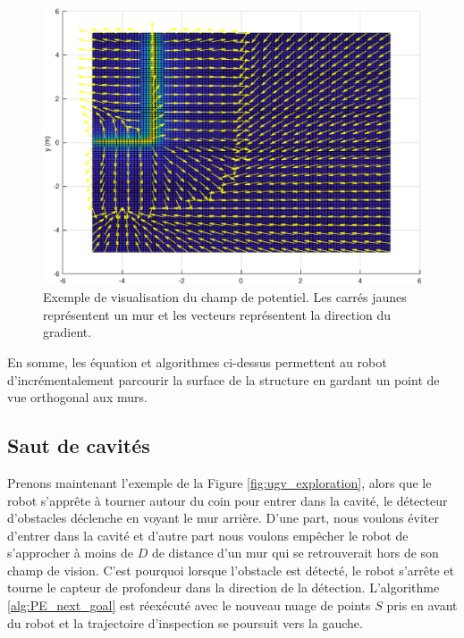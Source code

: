 \begin{figure}[ht]
  \centering
  \includegraphics[width=0.7\linewidth]{images/champ_de_potentiel.eps}
  \caption{Exemple de visualisation du champ de potentiel. Les carrés jaunes représentent un mur et les vecteurs représentent la direction du gradient. }
  \label{fig:potential_field}
\end{figure}

En somme, les équation et algorithmes ci-dessus permettent au robot d'incrémentalement parcourir la surface de la structure en gardant un point de vue orthogonal aux murs.

\subsection{Saut de cavités}
\label{subsec:ugv_cavity_skip}

Prenons maintenant l'exemple de la Figure \ref{fig:ugv_exploration}, alors que le robot s'apprête à tourner autour du coin pour entrer dans la cavité, le détecteur d'obstacles déclenche en voyant le mur arrière. D'une part, nous voulons éviter d'entrer dans la cavité et d'autre part nous voulons empêcher le robot de s'approcher à moins de $D$ de distance d'un mur qui se retrouverait hors de son champ de vision. C'est pourquoi lorsque l'obstacle est détecté, le robot s'arrête et tourne le capteur de profondeur dans la direction de la détection. L'algorithme \ref{alg:PE_next_goal} est réexécuté avec le nouveau nuage de points $S$ pris en avant du robot et la trajectoire d'inspection se poursuit vers la gauche.

